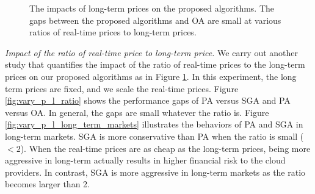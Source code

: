 \begin{figure}[!ht]    
	\centering
	\vspace{-0.5cm}
	\vspace{-0.2cm}
	\caption{The impacts of long-term prices on the proposed algorithms. The gaps between the proposed algorithms and OA are small at various ratios of real-time prices to long-term prices.}
	\label{fig:prices}
	\vspace{-0.3cm}
\end{figure}

\emph{Impact of the ratio of real-time price to long-term price.} We carry out another study that quantifies the impact of the ratio of real-time prices to the long-term prices on our proposed algorithms as in Figure {\ref{fig:prices}}. In this experiment, the long term prices are fixed, and we scale the real-time prices. Figure {\ref{fig:vary_p_l_ratio}} shows the performance gaps of PA versus SGA and PA versus OA. In general, the gaps are small whatever the ratio is. Figure {\ref{fig:vary_p_l_long_term_markets}} illustrates the behaviors of PA and SGA in long-term markets. SGA is more conservative than PA when the ratio is small ($<2$). When the real-time prices are as cheap as the long-term prices, being more aggressive in long-term actually results in higher financial risk to the cloud providers. In contrast, SGA is more aggressive in long-term markets as the ratio becomes larger than 2.

